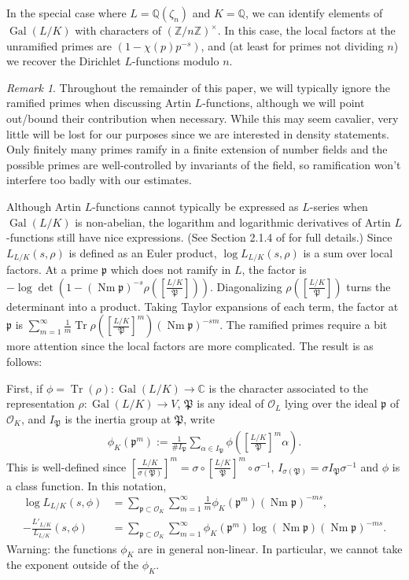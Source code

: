 \documentclass[12pt]{amsart}
\theoremstyle{definition}
\theoremstyle{remark}
\newtheorem{remark}[thm]{Remark}
\numberwithin{equation}{section}
\newcommand{\cO}{\mathcal O}
\newcommand{\fkp}{\mathfrak p}
\newcommand{\fkP}{\mathfrak{P}}
\newcommand{\bbC}{\mathbb C}
\newcommand{\bbQ}{\mathbb Q}
\newcommand{\bbZ}{\mathbb Z}
\DeclareMathOperator{\norm}{Nm}
\DeclareMathOperator{\trace}{Tr}
\newcommand{\inv}{^{-1}}
\newcommand{\artin}[2]{\left[ \frac{#1}{#2}\right]}
\DeclareMathOperator{\Gal}{Gal}
\begin{document}
In the special case where $L = \bbQ(\zeta_{n})$ and $K = \bbQ$, we can identify elements of $\Gal(L/K)$ with characters of $(\bbZ/n\bbZ)^{\times}$. In this case, the local factors at the unramified primes are $(1 - \chi(p)p^{-s})$, and (at least for primes not dividing $n$) we recover the Dirichlet $L$-functions modulo $n$.

\begin{remark} Throughout the remainder of this paper, we will typically ignore the ramified primes when discussing Artin $L$-functions, although we will point out/bound their contribution when necessary. While this may seem cavalier, very little will be lost for our purposes since we are interested in density statements. Only finitely many primes ramify in a finite extension of number fields and the possible primes are well-controlled by invariants of the field, so ramification won't  interfere too badly with our estimates.
\end{remark}

Although Artin $L$-functions cannot typically be expressed as $L$-series when $\Gal(L/K)$ is non-abelian, the logarithm and logarithmic derivatives of Artin $L$-functions still have nice expressions.  (See Section 2.1.4 of \cite{Snyder02} for full details.) Since $L_{L/K}(s,\rho)$ is defined as an Euler product, $\log L_{L/K}(s,\rho)$ is a sum over local factors. At a prime $\fkp$ which does not ramify in $L$, the factor is $-\log \det\left(1 - (\norm \fkp)^{-s} \rho\left(\artin{L/K}{\fkP}\right)\right)$. Diagonalizing $\rho\left(\artin{L/K}{\fkP}\right)$ turns the determinant into a product. Taking Taylor expansions of each term, the factor at $\fkp$ is $\sum_{m = 1}^{\infty} \frac{1}{m} \trace\rho\left(\artin{L/K}{\fkP}^{m} \right) (\norm \fkp)^{-sm}$. The ramified primes require a bit more attention since the local factors are more complicated. The result is as follows:

First, if $\phi = \trace(\rho): \Gal(L/K) \to \bbC$ is the character associated to the representation $\rho: \Gal(L/K) \to V$, $\fkP$ is any ideal of $\cO_{L}$ lying over the ideal $\fkp$ of $\cO_{K}$, and $I_{\fkP}$ is the inertia group at $\fkP$, write
\begin{align}
\phi_{K}(\fkp^{m}) := \frac{1}{\# I_{\fkP}} \sum_{\alpha \in I_{\fkP}} \phi\left(\artin{L/K}{\fkP}^{m} \alpha\right).
\end{align}
This is well-defined since $\artin{L/K}{\sigma(\fkP)}^{m} = \sigma \circ \artin{L/K}{\fkP}^{m} \circ\sigma\inv$, $I_{\sigma(\fkP)} = \sigma I_{\fkP} \sigma\inv$ and $\phi$ is a class function. In this notation,
\begin{align} \label{eqn:ArtinLogFormula}
\log L_{L/K}(s,\phi) &= \sum_{\fkp \subset \cO_{K}}\sum_{m = 1}^{\infty} \frac{1}{m} \phi_{K}(\fkp^m) (\norm \fkp)^{-ms},\\ \label{eqn:ArtinLogDerFormula}
-\frac{L'_{L/K}}{L_{L/K}}(s,\phi) &= \sum_{\fkp \subset \cO_{K}} \sum_{m=1}^{\infty} \phi_{K}(\fkp^m) \log(\norm \fkp) (\norm \fkp)^{-ms}.
\end{align}
Warning: the functions $\phi_{K}$ are in general non-linear. In particular, we cannot take the exponent outside of the $\phi_{K}$. 
\end{document}
